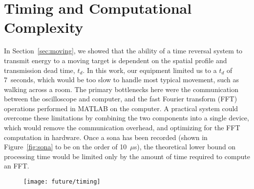 \section{Timing and Computational Complexity}
\label{sec:future-timing}

In Section~\ref{sec:moving}, we showed that the ability of a time reversal system
to transmit energy to a moving target is dependent on the spatial profile and
transmission dead time, $t_{d}$.
%
In this work, our equipment limited us to a $t_d$ of 7~seconds, which would be too slow
to handle most typical movement, such as walking across a room.
%
The primary bottlenecks here were the communication between the oscilloscope
and computer, and the fast Fourier transform (FFT) operations performed in MATLAB
on the computer.
%
A practical system could overcome these limitations by combining the two components
into a single device, which would remove the communication overhead, and optimizing for
the FFT computation in hardware.
%
Once a sona has been recorded (shown in Figure~\ref{fig:sona} to be on the order of 10~$\mu$s),
the theoretical lower bound on processing time would be limited only by the amount of
time required to compute an FFT.

\begin{figure}[t]
\centering
\texttt{[image: future/timing]}
\caption[Timing Analysis of Experimental Setup]{}
\label{fig:timing}
\end{figure}
